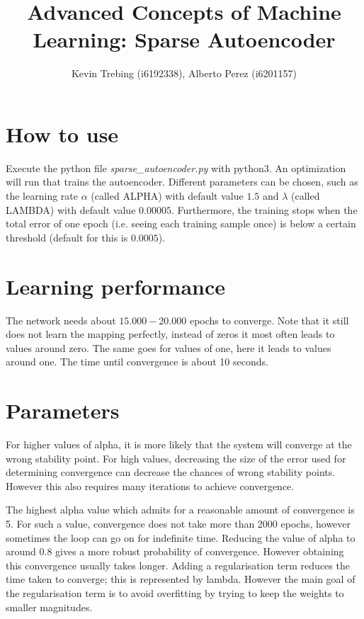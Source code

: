 \documentclass[a4paper]{article}
\title{Advanced Concepts of Machine Learning: Sparse Autoencoder}
\author{Kevin Trebing (i6192338), Alberto Perez (i6201157)}
\begin{document}
\maketitle

\section{How to use}

Execute the python file \textit{sparse\_autoencoder.py} with python3. An optimization will run that trains the autoencoder. Different parameters can be chosen, such as the learning rate $\alpha$ (called ALPHA) with default value $1.5$ and $\lambda$ (called LAMBDA) with default value $0.00005$. Furthermore, the training stops when the total error of one epoch (i.e. seeing each training sample once) is below a certain threshold (default for this is $0.0005$).

\section{Learning performance}
The network needs about $15.000-20.000$ epochs to converge. Note that it still does not learn the mapping perfectly, instead of zeros it most often leads to values around zero. The same goes for values of one, here it leads to values around one. The time until convergence is about 10 seconds.

\section{Parameters}

For higher values of alpha, it is more likely that the system will converge at the wrong stability point. For high values, decreasing the size of the error used for determining convergence can decrease the chances of wrong stability points. However this also requires many iterations to achieve convergence.

The highest alpha value which admits for a reasonable amount of convergence is 5. For such a value, convergence does not take more than 2000 epochs, however sometimes the loop can go on for indefinite time. Reducing the value of alpha to around 0.8 gives a  more robust probability of  convergence. However obtaining this convergence usually takes longer. Adding a regularisation term reduces the time taken to converge; this is represented by lambda. However the main goal of the regularisation term is to avoid overfitting by trying to keep the weights to smaller magnitudes.
\end{document}
